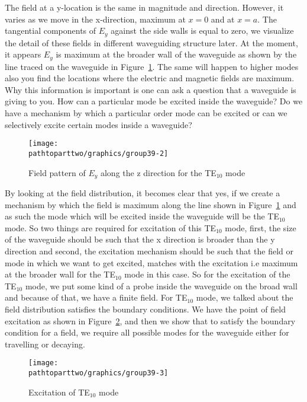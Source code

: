 The field at a y-location is the same in magnitude and direction. However, it varies as we move in the x-direction, maximum at $x = 0$ and at $x = a$. The tangential components of $E_y$ against the side walls is equal to zero, we visualize the detail of these fields in different waveguiding structure later. At the moment, it appears $E_y$ is maximum at the broader wall of the waveguide as shown by the line traced on the waveguide in Figure~\ref{fig:lec39-2}. The same will happen to higher modes also you find the locations where the electric and magnetic fields are maximum. Why this information is important is one can ask a question that a waveguide is giving to you. How can a particular mode be excited inside the waveguide? Do we have a mechanism by which a particular order mode can be excited or can we selectively excite certain modes inside a waveguide?
\begin{figure}[h]
\centering
\texttt{[image: \\pathtoparttwo/graphics/group39-2]}
\caption{Field pattern of $E_y$ along the z direction for the TE$_{10}$ mode}
\label{fig:lec39-2}
\end{figure}

By looking at the field distribution, it becomes clear that yes, if we create a mechanism by which the field is maximum along the line shown in Figure~\ref{fig:lec39-2} and as such the mode which will be excited inside the waveguide will be the TE$_{10}$ mode. So two things are required for excitation of this TE$_{10}$ mode, first, the size of the waveguide should be such that the x direction is broader than the y direction and second, the excitation mechanism should be such that the field or mode in which we want to get excited, matches with the excitation i.e maximum at the broader wall for the TE$_{10}$ mode in this case. So for the excitation of the TE$_{10}$ mode, we put some kind of a probe inside the waveguide on the broad wall and because of that, we have a finite field. For TE$_{10}$ mode, we talked about the field distribution satisfies the boundary conditions. We have the point of field excitation as shown in Figure~\ref{fig:lec39-3}, and then we show that to satisfy the boundary condition for a field, we require all possible modes for the waveguide either for travelling or decaying.
\begin{figure}[h]
\centering
\texttt{[image: \\pathtoparttwo/graphics/group39-3]}
\caption{Excitation of TE$_{10}$ mode}
\label{fig:lec39-3}
\end{figure}

